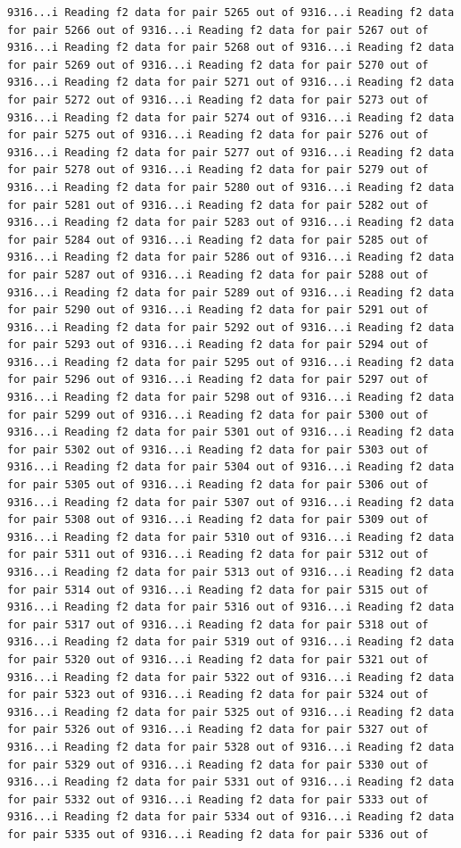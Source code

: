 \documentclass[
]{article}
\begin{document}
\begin{verbatim}
9316...i Reading f2 data for pair 5265 out of 9316...i Reading f2 data for pair 5266 out of 9316...i Reading f2 data for pair 5267 out of 9316...i Reading f2 data for pair 5268 out of 9316...i Reading f2 data for pair 5269 out of 9316...i Reading f2 data for pair 5270 out of 9316...i Reading f2 data for pair 5271 out of 9316...i Reading f2 data for pair 5272 out of 9316...i Reading f2 data for pair 5273 out of 9316...i Reading f2 data for pair 5274 out of 9316...i Reading f2 data for pair 5275 out of 9316...i Reading f2 data for pair 5276 out of 9316...i Reading f2 data for pair 5277 out of 9316...i Reading f2 data for pair 5278 out of 9316...i Reading f2 data for pair 5279 out of 9316...i Reading f2 data for pair 5280 out of 9316...i Reading f2 data for pair 5281 out of 9316...i Reading f2 data for pair 5282 out of 9316...i Reading f2 data for pair 5283 out of 9316...i Reading f2 data for pair 5284 out of 9316...i Reading f2 data for pair 5285 out of 9316...i Reading f2 data for pair 5286 out of 9316...i Reading f2 data for pair 5287 out of 9316...i Reading f2 data for pair 5288 out of 9316...i Reading f2 data for pair 5289 out of 9316...i Reading f2 data for pair 5290 out of 9316...i Reading f2 data for pair 5291 out of 9316...i Reading f2 data for pair 5292 out of 9316...i Reading f2 data for pair 5293 out of 9316...i Reading f2 data for pair 5294 out of 9316...i Reading f2 data for pair 5295 out of 9316...i Reading f2 data for pair 5296 out of 9316...i Reading f2 data for pair 5297 out of 9316...i Reading f2 data for pair 5298 out of 9316...i Reading f2 data for pair 5299 out of 9316...i Reading f2 data for pair 5300 out of 9316...i Reading f2 data for pair 5301 out of 9316...i Reading f2 data for pair 5302 out of 9316...i Reading f2 data for pair 5303 out of 9316...i Reading f2 data for pair 5304 out of 9316...i Reading f2 data for pair 5305 out of 9316...i Reading f2 data for pair 5306 out of 9316...i Reading f2 data for pair 5307 out of 9316...i Reading f2 data for pair 5308 out of 9316...i Reading f2 data for pair 5309 out of 9316...i Reading f2 data for pair 5310 out of 9316...i Reading f2 data for pair 5311 out of 9316...i Reading f2 data for pair 5312 out of 9316...i Reading f2 data for pair 5313 out of 9316...i Reading f2 data for pair 5314 out of 9316...i Reading f2 data for pair 5315 out of 9316...i Reading f2 data for pair 5316 out of 9316...i Reading f2 data for pair 5317 out of 9316...i Reading f2 data for pair 5318 out of 9316...i Reading f2 data for pair 5319 out of 9316...i Reading f2 data for pair 5320 out of 9316...i Reading f2 data for pair 5321 out of 9316...i Reading f2 data for pair 5322 out of 9316...i Reading f2 data for pair 5323 out of 9316...i Reading f2 data for pair 5324 out of 9316...i Reading f2 data for pair 5325 out of 9316...i Reading f2 data for pair 5326 out of 9316...i Reading f2 data for pair 5327 out of 9316...i Reading f2 data for pair 5328 out of 9316...i Reading f2 data for pair 5329 out of 9316...i Reading f2 data for pair 5330 out of 9316...i Reading f2 data for pair 5331 out of 9316...i Reading f2 data for pair 5332 out of 9316...i Reading f2 data for pair 5333 out of 9316...i Reading f2 data for pair 5334 out of 9316...i Reading f2 data for pair 5335 out of 9316...i Reading f2 data for pair 5336 out of 
\end{verbatim}
\end{document}
